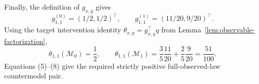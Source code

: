 Finally, the definition of \(g_{x,y}\) gives
\[
g^{(0)}_{1,1}=(1/2,1/2)^{\top},
\qquad
g^{(1)}_{1,1}=(11/20,9/20)^{\top}.
\tag{7}
\]
Using the target intervention identity \(\theta_{x,y}=g_{x,y}^{\top}q\) from Lemma~\ref{lem:observable-factorization},
\[
\theta_{1,1}(\mathcal M_0)=\frac12,
\qquad
\theta_{1,1}(\mathcal M_1)
=\frac35\frac{11}{20}+\frac25\frac9{20}
=\frac{51}{100}.
\tag{8}
\]
Equations (5)--(8) give the required strictly positive full-observed-law countermodel pair.